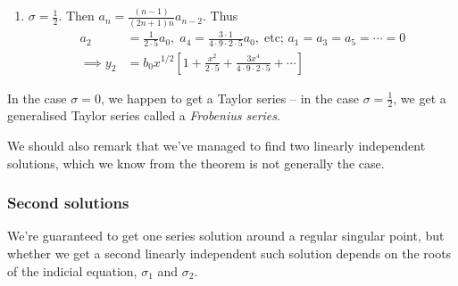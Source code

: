 \documentclass{../template/note}
\begin{document}
\begin{example}
\begin{enumerate}[label=\protect\circled{\arabic*}]
\begin{align*}
                \implies y_1 &= a_0\left[1+\frac{x^2}{4 \cdot 3} + \frac{5x^4}{8\cdot 7 \cdot 4 \cdot 3} + \cdots\right]
            \end{align*}
            \item \(\sigma = \frac{1}{2}\). Then \(a_n = \frac{(n-1)}{(2n+1)n}a_{n-2}\). Thus
            \begin{align*}
                a_2 &= \frac{1}{2 \cdot 5}a_0,\; a_4 = \frac{3 \cdot 1}{4 \cdot 9 \cdot 2 \cdot 5}a_0, \; \text{etc; } a_1 = a_3 = a_5 = \cdots = 0 \\
                \implies y_2 &= b_0x^{1/2}\left[1+\frac{x^2}{2\cdot 5} + \frac{3x^4}{4 \cdot 9 \cdot 2 \cdot 5} + \cdots\right]
            \end{align*}
        \end{enumerate}
        In the case \(\sigma = 0\), we happen to get a Taylor series -- in the case \(\sigma = \frac{1}{2}\), we get a generalised Taylor series called a \emph{Frobenius series}.

        We should also remark that we've managed to find two linearly independent solutions, which we know from the theorem is not generally the case.        
    \end{example}
    
    \subsubsection{Second solutions}

    We're guaranteed to get one series solution around a regular singular point, but whether we get a second linearly independent such solution depends on the roots of the indicial equation, \(\sigma_1\) and \(\sigma_2\).
\end{document}
